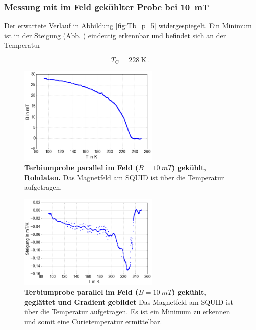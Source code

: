 \documentclass[a4paper,ngerman]{scrartcl}
\begin{document}
\subsubsection*{Messung mit im Feld gekühlter Probe bei \SI{10}{mT}}

Der erwartete Verlauf in Abbildung \ref{fig:Tb_p_5} widergespiegelt.
Ein Minimum ist in der Steigung (Abb. ) eindeutig erkennbar und befindet sich an der Temperatur

\begin{equation}
T_{\mathrm{C}} = \SI{228}{\K} ~.
\end{equation}



\begin{figure}
\centering
\includegraphics[width=0.6\textwidth]{abbildungen/Tb_p_10.png}
\caption[Terbiumprobe parallel bei 10mT]{\textbf{Terbiumprobe parallel im Feld ($B = \SI{10}{mT}$) gekühlt, Rohdaten.} 
Das Magnetfeld am SQUID ist über die Temperatur aufgetragen. }
\label{fig:Tb_p_10}
\end{figure}

\begin{figure}
\centering
\includegraphics[width=0.6\textwidth]{abbildungen/Tb_p_10_grad.png}
\caption[Terbiumprobe parallel bei 10mT]{\textbf{Terbiumprobe parallel im Feld ($B = \SI{10}{mT}$) gekühlt, geglättet und Gradient gebildet} 
Das Magnetfeld am SQUID ist über die Temperatur aufgetragen. 
Es ist ein Minimum zu erkennen und somit eine Curietemperatur ermittelbar.}
\label{fig:Tb_p_10_grad}
\end{figure}
\end{document}
